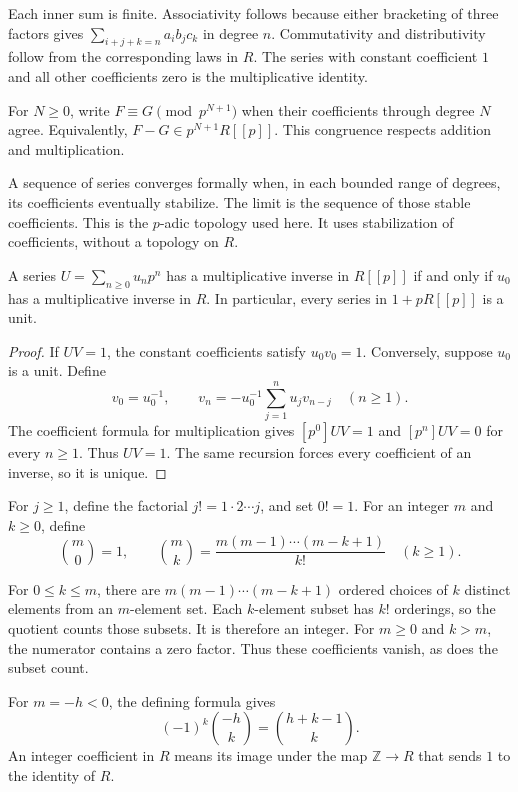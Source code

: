 Each inner sum is finite. Associativity follows because either bracketing
of three factors gives $\sum_{i+j+k=n}a_i b_j c_k$ in degree $n$.
Commutativity and distributivity follow from the corresponding laws in $R$.
The series with constant coefficient $1$ and all other coefficients zero
is the multiplicative identity.

For $N\geq0$, write $F\equiv G\pmod{p^{N+1}}$ when their coefficients
through degree $N$ agree. Equivalently,
$F-G\in p^{N+1}R[[p]]$. This congruence respects addition and multiplication.

A sequence of series converges formally when, in each bounded range of
degrees, its coefficients eventually stabilize. The limit is the sequence
of those stable coefficients. This is the $p$-adic topology used here.
It uses stabilization of coefficients, without a topology on $R$.

\begin{lemma}
\label{lem:pc-units}
A series $U=\sum_{n\geq0}u_np^n$ has a multiplicative inverse in $R[[p]]$
if and only if $u_0$ has a multiplicative inverse in $R$.
In particular, every series in $1+pR[[p]]$ is a unit.
\end{lemma}

\begin{proof}
If $UV=1$, the constant coefficients satisfy $u_0v_0=1$.
Conversely, suppose $u_0$ is a unit. Define
\[
 v_0=u_0^{-1},\qquad
 v_n=-u_0^{-1}\sum_{j=1}^n u_jv_{n-j}\quad(n\geq1).
\]
The coefficient formula for multiplication gives $[p^0]UV=1$ and
$[p^n]UV=0$ for every $n\geq1$. Thus $UV=1$.
The same recursion forces every coefficient of an inverse, so it is unique.
\end{proof}

For $j\geq1$, define the factorial $j!=1\cdot2\cdots j$, and set $0!=1$.
For an integer $m$ and $k\geq0$, define
\[
 \binom{m}{0}=1,\qquad
 \binom{m}{k}=\frac{m(m-1)\cdots(m-k+1)}{k!}\quad(k\geq1).
\]

For $0\leq k\leq m$, there are $m(m-1)\cdots(m-k+1)$ ordered choices
of $k$ distinct elements from an $m$-element set.
Each $k$-element subset has $k!$ orderings, so the quotient counts those
subsets. It is therefore an integer.
For $m\geq0$ and $k>m$, the numerator contains a zero factor.
Thus these coefficients vanish, as does the subset count.

For $m=-h<0$, the defining formula gives
\[
 (-1)^k\binom{-h}{k}=\binom{h+k-1}{k}.
\]
An integer coefficient in $R$ means its image under the map
$\mathbb Z\to R$ that sends $1$ to the identity of $R$.

